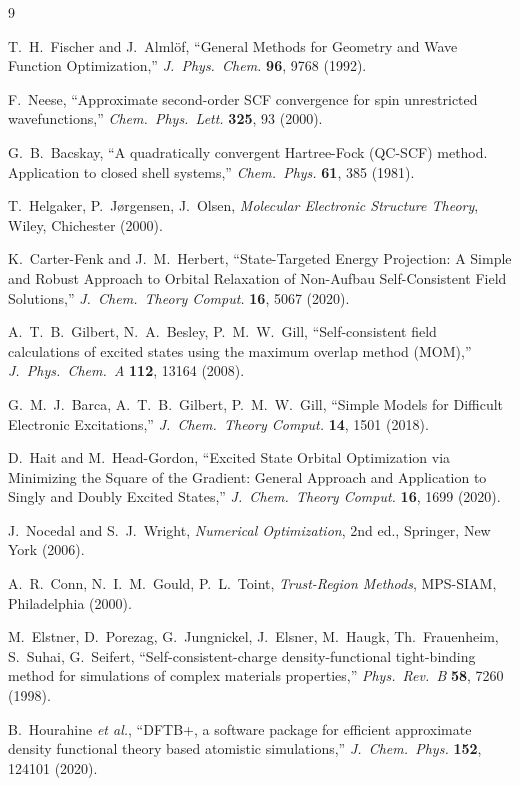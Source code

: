 \documentclass[11pt,a4paper]{article}
\begin{document}
\begin{thebibliography}{9}

T.\ H.\ Fischer and J.\ Alml\"of,
``General Methods for Geometry and Wave Function Optimization,''
\emph{J.\ Phys.\ Chem.} \textbf{96}, 9768 (1992).

F.\ Neese,
``Approximate second-order SCF convergence for spin unrestricted
wavefunctions,''
\emph{Chem.\ Phys.\ Lett.} \textbf{325}, 93 (2000).

G.\ B.\ Bacskay,
``A quadratically convergent Hartree-Fock (QC-SCF) method.
Application to closed shell systems,''
\emph{Chem.\ Phys.} \textbf{61}, 385 (1981).

T.\ Helgaker, P.\ J\o{}rgensen, J.\ Olsen,
\emph{Molecular Electronic Structure Theory},
Wiley, Chichester (2000).

K.\ Carter-Fenk and J.\ M.\ Herbert,
``State-Targeted Energy Projection: A Simple and Robust Approach to
Orbital Relaxation of Non-Aufbau Self-Consistent Field Solutions,''
\emph{J.\ Chem.\ Theory Comput.} \textbf{16}, 5067 (2020).

A.\ T.\ B.\ Gilbert, N.\ A.\ Besley, P.\ M.\ W.\ Gill,
``Self-consistent field calculations of excited states using the
maximum overlap method (MOM),''
\emph{J.\ Phys.\ Chem.\ A} \textbf{112}, 13164 (2008).

G.\ M.\ J.\ Barca, A.\ T.\ B.\ Gilbert, P.\ M.\ W.\ Gill,
``Simple Models for Difficult Electronic Excitations,''
\emph{J.\ Chem.\ Theory Comput.} \textbf{14}, 1501 (2018).

D.\ Hait and M.\ Head-Gordon,
``Excited State Orbital Optimization via Minimizing the Square of the
Gradient: General Approach and Application to Singly and Doubly
Excited States,''
\emph{J.\ Chem.\ Theory Comput.} \textbf{16}, 1699 (2020).

J.\ Nocedal and S.\ J.\ Wright,
\emph{Numerical Optimization}, 2nd ed.,
Springer, New York (2006).

A.\ R.\ Conn, N.\ I.\ M.\ Gould, P.\ L.\ Toint,
\emph{Trust-Region Methods},
MPS-SIAM, Philadelphia (2000).

M.\ Elstner, D.\ Porezag, G.\ Jungnickel, J.\ Elsner, M.\ Haugk, Th.\ Frauenheim,
S.\ Suhai, G.\ Seifert,
``Self-consistent-charge density-functional tight-binding method for simulations of
complex materials properties,''
\emph{Phys.\ Rev.\ B} \textbf{58}, 7260 (1998).

B.\ Hourahine \emph{et al.},
``DFTB+, a software package for efficient approximate density
functional theory based atomistic simulations,''
\emph{J.\ Chem.\ Phys.} \textbf{152}, 124101 (2020).

\end{thebibliography}
\end{document}
